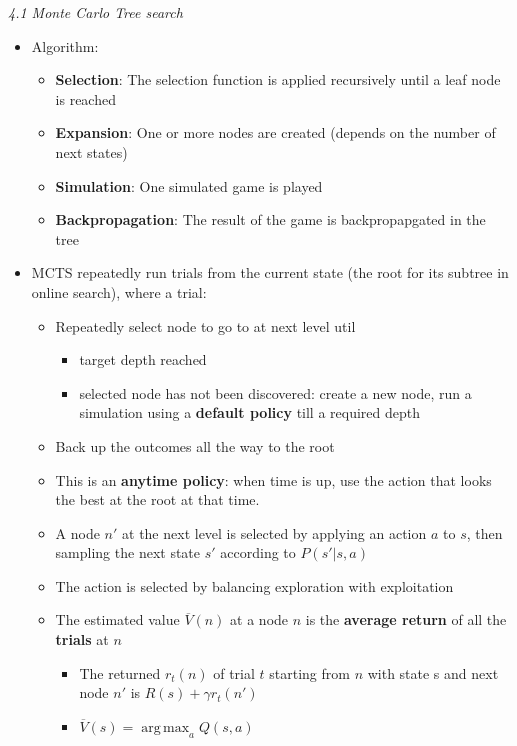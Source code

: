 \documentclass[12pt]{article}
\begin{document}
\noindent
\textsl{4.1 Monte Carlo Tree search}
\begin{itemize}
\item Algorithm:

\begin{itemize}
\item \textbf{Selection}: The selection function is applied recursively until a leaf node is reached
\item \textbf{Expansion}: One or more nodes are created (depends on the number of next states)
\item \textbf{Simulation}: One simulated game is played
\item \textbf{Backpropagation}: The result of the game is backpropapgated in the tree
\end{itemize}

\item MCTS repeatedly run trials from the current state (the root for its subtree in online search), where a trial:

\begin{itemize}
\item Repeatedly select node to go to at next level util
	\begin{itemize}
	\item target depth reached 
	\item selected node has not been discovered: create a new node, run a simulation using a \textbf{default policy} till a required depth
	\end{itemize}

\item Back up the outcomes all the way to the root

 \item This is an \textbf{anytime policy}: when time is up, use the action that looks the best at the root at that time.
 
 \item A node $n'$ at the next level is selected by applying an action $a$ to $s$, then sampling the next state $s'$ according to $P(s' | s, a)$
 
 \item The action is selected by balancing exploration with exploitation
 \item The estimated value $\overline V(n)$ at a node $n$ is the \textbf{average return} of all the \textbf{trials} at $n$
 \begin{itemize}
 \item The returned $r_t(n)$ of trial $t$ starting from $n$ with state s and next node $n'$ is $R(s) + \gamma r_t(n')$
 \item $\overline V(s) = \operatorname*{arg\,max}_{a} Q(s,a)$
 \end{itemize}
 

\end{itemize}
\end{itemize}
\end{document}
